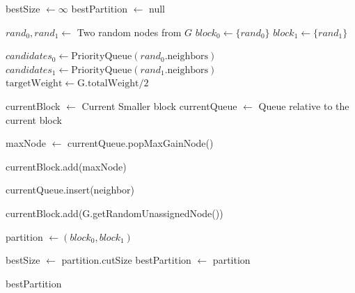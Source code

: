 \documentclass{article}
\begin{document}
\begin{algorithm}
\caption{RB2}
\begin{algorithmic}
        \State bestSize $\gets \infty$
        \State bestPartition $\gets$ null
        \Statex


            \State $rand_0, rand_1 \gets $ Two random nodes from $G$
            \State $block_0 \gets \{rand_0\}$
            \State $block_1 \gets \{rand_1\}$
            \Statex
            
            \State $candidates_0 \gets \text{PriorityQueue}(rand_0.\text{neighbors})$
            \State $candidates_1 \gets \text{PriorityQueue}(rand_1.\text{neighbors})$
            \State $\text{targetWeight} \gets \text{G.totalWeight}/2$
            \Statex
            
                
                \State currentBlock $\gets$ Current Smaller block
                \State currentQueue $\gets$ Queue relative to the current block
                \Statex
                
                    \State maxNode $\gets$ currentQueue.popMaxGainNode()
                    
                        \State currentBlock.add(maxNode)
                        \Statex
                        
                                \State currentQueue.insert(neighbor)
                            \EndIf
                        \EndFor
                        \Statex
                        
                    \EndIf
                \Else
                    \State currentBlock.add(G.getRandomUnassignedNode())
                \EndIf
            \EndWhile
            \Statex

            \State partition $\gets (block_0, block_1)$ 
        
                \State bestSize $\gets$ partition.cutSize
                \State bestPartition $\gets$ partition
            \EndIf
    
        \EndFor
    
    
        \State \Return bestPartition
    \EndFunction
\end{algorithmic}
\end{algorithm}
\end{document}
